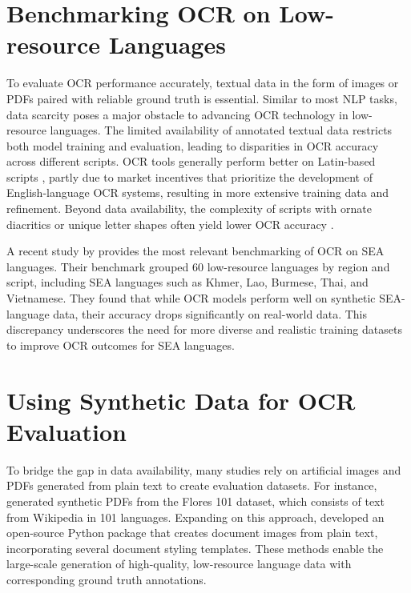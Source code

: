 \documentclass[12pt,oneside]{memoir}
\begin{document}
\section{Benchmarking OCR on Low-resource Languages}

To evaluate OCR performance accurately, textual data in the form of images or PDFs paired with reliable ground truth is essential. 
Similar to most NLP tasks, data scarcity poses a major obstacle to advancing OCR technology in low-resource languages. The limited availability of annotated textual data restricts both model training and evaluation, leading to disparities in OCR accuracy across different scripts.
OCR tools generally perform better on Latin-based scripts \parencite{hegghammer-2022, ignat-etal-2022}, partly due to market incentives that prioritize the development of English-language OCR systems, resulting in more extensive training data and refinement. Beyond data availability, the complexity of scripts with ornate diacritics or unique letter shapes often yield lower OCR accuracy \parencite{agarwal-and-anastasopoulos-2024}.

A recent study by \textcite{ignat-etal-2022} provides the most relevant benchmarking of OCR on SEA languages.
Their benchmark grouped 60 low-resource languages by region and script, including SEA languages such as Khmer, Lao, Burmese, Thai, and Vietnamese.
They found that while OCR models perform well on synthetic SEA-language data, their accuracy drops significantly on real-world data.
This discrepancy underscores the need for more diverse and realistic training datasets to improve OCR outcomes for SEA languages.

\section{Using Synthetic Data for OCR Evaluation}

To bridge the gap in data availability, many studies rely on artificial images and PDFs generated from plain text to create evaluation datasets.
For instance, \textcite{ignat-etal-2022} generated synthetic PDFs from the Flores 101 dataset, which consists of text from Wikipedia in 101 languages.
Expanding on this approach, \textcite{gupte-etal-2021} developed an open-source Python package that creates document images from plain text, incorporating several document styling templates.
These methods enable the large-scale generation of high-quality, low-resource language data with corresponding ground truth annotations.
\end{document}
